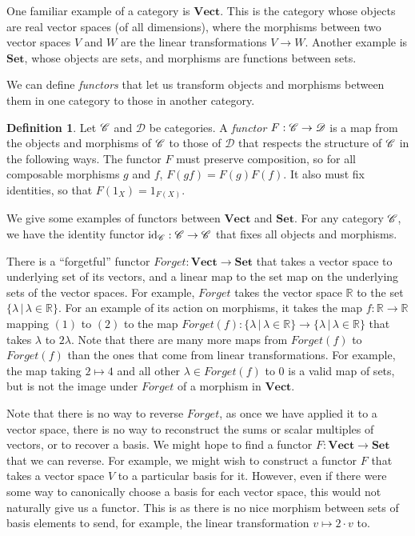 \documentclass[a4paper,11pt,leqno]{article} \usepackage{amsmath}
\newcommand{\RR}{\mathbb{R}} \newcommand{\QQ}{\mathbb{Q}}
\newcommand{\curD}{\mathscr{D}} \newcommand{\curI}{\mathscr{I}}
\newcommand{\id}{\ensuremath{\operatorname{id}}}
\theoremstyle{definition}
\newtheorem{defn}{Definition}
\begin{document}
One familiar example of a category is $\textbf{Vect}$.
This is the category whose objects are real vector spaces (of all dimensions),
where the morphisms between two vector spaces $V$ and $W$ are the linear
transformations $V\to W$.
Another example is $\textbf{Set}$, whose objects are sets, and morphisms are
functions between sets.

We can define \emph{functors} that let us transform objects and morphisms between them in
one category to those in another category.

\begin{defn}
  Let $\mathscr{C}$ and $\curD$ be categories.
  A \emph{functor} $F: \curC\to \curD$ is a map from the objects and morphisms
  of $\mathscr{C}$ to those of $\curD$ that respects the structure of $\mathscr{C}$ in the
  following ways.
  The functor $F$ must preserve composition, so for all composable morphisms
  $g$ and $f$, $F(gf) = F(g)F(f)$.
  It also must fix identities, so that $F(1_X) = 1_{F(X)}$.
\end{defn}

We give some examples of functors between $\textbf{Vect}$ and $\textbf{Set}$.
For any category $\mathscr{C}$, we have the identity functor $\id_{\curC}:
\curC\to \curC$ that fixes all objects and morphisms.

There is a ``forgetful'' functor $Forget: \textbf{Vect}\to \textbf{Set}$ that
takes a vector space to underlying set of its vectors, and a linear map to the
set map on the underlying sets of the vector spaces.
For example, $Forget$ takes the vector space $\RR$ to the set $\{\lambda\,|\,
\lambda\in\RR\}$.
For an example of its action on morphisms, it takes the map $f: \RR\to\RR$
mapping $(1)$ to $(2)$ to the map
$Forget(f): \{\lambda\,|\,\lambda\in\RR\}\to \{\lambda\,|\,\lambda\in\RR\}$
that takes $\lambda$ to $2\lambda$.
Note that there are many more maps from $Forget(f)$ to $Forget(f)$ than the
ones that come from linear transformations.
For example, the map taking $2\mapsto 4$ and all other $\lambda\in Forget(f)$
to $0$ is a valid map of sets, but is not the image under $Forget$ of
a morphism in $\textbf{Vect}$.

Note that there is no way to reverse $Forget$, as once we have applied it to
a vector space, there is no way to reconstruct the sums or scalar multiples of
vectors, or to recover a basis.
We might hope to find a functor $F: \textbf{Vect}\to\textbf{Set}$ that we can
reverse.
For example, we might wish to construct a functor $F$ that takes a vector space
$V$ to a particular basis for it.
However, even if there were some way to canonically choose a basis for each
vector space, this would not naturally give us a functor.
This is as there is no nice morphism between sets of basis elements to send,
for example, the linear transformation $v\mapsto 2\cdot v$ to.
\end{document}
